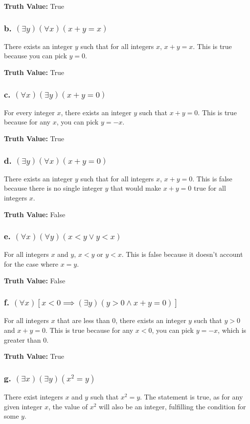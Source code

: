\documentclass[12pt]{article}
\begin{document}
\textbf{Truth Value:} True

\subsubsection*{b. \((\exists y)(\forall x)(x + y = x)\)}
There exists an integer \( y \) such that for all integers \( x \), \( x + y = x \). This is true because you can pick \( y = 0 \).

\textbf{Truth Value:} True

\subsubsection*{c. \((\forall x)(\exists y)(x + y = 0)\)}
For every integer \( x \), there exists an integer \( y \) such that \( x + y = 0 \). This is true because for any \( x \), you can pick \( y = -x \).

\textbf{Truth Value:} True

\subsubsection*{d. \((\exists y)(\forall x)(x + y = 0)\)}
There exists an integer \( y \) such that for all integers \( x \), \( x + y = 0 \). This is false because there is no single integer \( y \) that would make \( x + y = 0 \) true for all integers \( x \).

\textbf{Truth Value:} False

\subsubsection*{e. \((\forall x)(\forall y)(x < y \lor y < x)\)}
For all integers \( x \) and \( y \), \( x < y \) or \( y < x \). This is false because it doesn't account for the case where \( x = y \).

\textbf{Truth Value:} False

\subsubsection*{f. \((\forall x)[x < 0 \implies (\exists y)(y > 0 \land x + y = 0)]\)}
For all integers \( x \) that are less than 0, there exists an integer \( y \) such that \( y > 0 \) and \( x + y = 0 \). This is true because for any \( x < 0 \), you can pick \( y = -x \), which is greater than 0.

\textbf{Truth Value:} True

\subsubsection*{g. \((\exists x)(\exists y)(x^2 = y)\)}
There exist integers \( x \) and \( y \) such that \( x^2 = y \). The statement is true, as for any given integer \( x \), the value of \( x^2 \) will also be an integer, fulfilling the condition for some \( y \).
\end{document}
